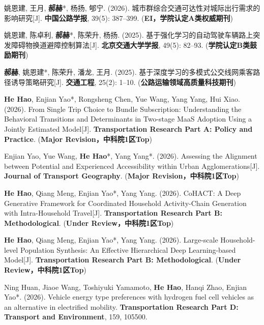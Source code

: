 \begin{enumerate}[leftmargin=*, parsep=5pt, label={[\arabic*]}]
	\item 姚恩建, 王月, \textbf{郝赫}*, 杨扬, 郇宁. (2026). 城市群综合交通可达性对城际出行需求的影响研究[J]. \textbf{中国公路学报}, 39(5): 387--399. (\textbf{EI，学院认定A类权威期刊})

	\item 姚恩建, 陈卓利, \textbf{郝赫}*, 陈荣升, 杨扬. (2025). 基于强化学习的自动驾驶车辆路上突发障碍物换道避障控制算法[J]. \textbf{北京交通大学学报}, 49(5): 82--93. (\textbf{学院认定B类鼓励期刊})

	\item \textbf{郝赫}, 姚恩建*, 陈荣升, 潘龙, 王月. (2025). 基于深度学习的多模式公交线网乘客路径诱导策略研究[J]. \textbf{交通工程}, 25(2): 1--10. (\textbf{公路运输领域高质量科技期刊})
	
	\item \textbf{He Hao}, Enjian Yao*, Rongsheng Chen, Yue Wang, Yang Yang, Hui Xiao. (2026). From Single Trip Choice to Bundle Subscription: Understanding the Behavioral Transitions and Determinants in Two-stage MaaS Adoption Using a Jointly Estimated Model[J]. \textbf{Transportation Research Part A: Policy and Practice}. (\textbf{Major Revision，中科院1区Top})
	
	\item Enjian Yao, Yue Wang, \textbf{He Hao}*, Yang Yang*. (2026). Assessing the Alignment between Potential and Experienced Accessibility within Urban Agglomerations[J]. \textbf{Journal of Transport Geography}. (\textbf{Major Revision，中科院1区Top})
	
	\item \textbf{He Hao}, Qiang Meng, Enjian Yao*, Yang Yang. (2026). CoHACT: A Deep Generative Framework for Coordinated Household Activity-Chain Generation with Intra-Household Travel[J]. \textbf{Transportation Research Part B: Methodological}. (\textbf{Under Review，中科院1区Top})

	\item \textbf{He Hao}, Qiang Meng, Enjian Yao*, Yang Yang. (2026). Large-scale Household-level Population Synthesis: An Effective Hierarchical Deep Learning-based Model[J]. \textbf{Transportation Research Part B: Methodological}. (\textbf{Under Review，中科院1区Top})
	
	\item Ning Huan, Jiaoe Wang, Toshiyuki Yamamoto, \textbf{He Hao}, Hanqi Zhao, Enjian Yao*. (2026). Vehicle energy type preferences with hydrogen fuel cell vehicles as an alternative in electrified mobility. \textbf{Transportation Research Part D: Transport and Environment}, 159, 105500.


\end{enumerate}
